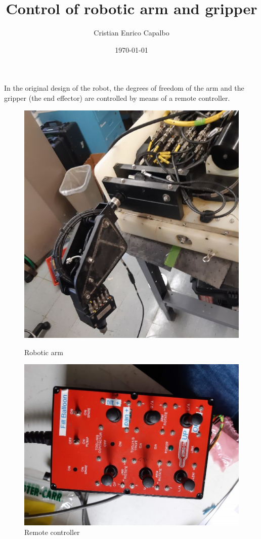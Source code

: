 \documentclass[12pt, a4paper]{article}
\title{Control of robotic arm and gripper}
\author{Cristian Enrico Capalbo}
\date{\today}
\begin{document}
\maketitle
\newpage
In the original design of the robot, the degrees of freedom of the arm and the gripper (the end effector) are controlled by means of a remote controller. 


\begin{figure}[ht]
	\begin{minipage}[b]{0.45\linewidth}
		\centering
		\includegraphics[width=\textwidth]{arm}
		\caption{Robotic arm}
		\label{fig:arm}
	\end{minipage}
	\hspace{0.5cm}
	\begin{minipage}[b]{0.45\linewidth}
		\centering
		\includegraphics[width=\textwidth, angle=-90]{remote.jpg}
		\caption{Remote controller}
		\label{fig:remote}
	\end{minipage}
\end{figure}
\end{document}
